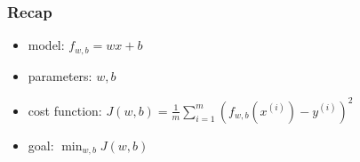 \documentclass[a4paper]{article}
\begin{document}
\subsubsection{Recap}
\begin{itemize}
    \item model: \(f_{w,b} = wx + b\)
    \item parameters: \(w,b\)
    \item cost function: \(J\left(w, b\right) = \frac{1}{m}\sum_{i = 1}^{m}\left(f_{w,b}\left(x^{(i)}\right) - y^{(i)}\right)^2\)
    \item goal: \(\displaystyle \min_{w,b} J\left(w,b\right)\)
\end{itemize}
\end{document}
